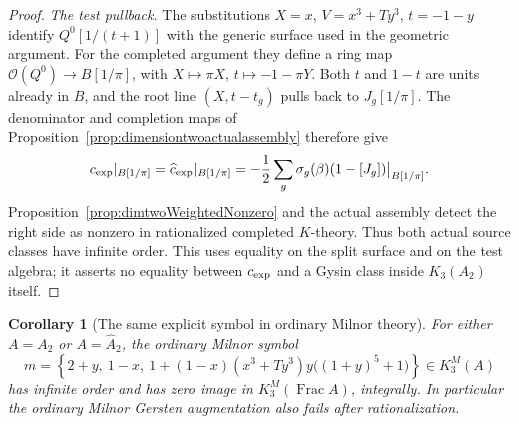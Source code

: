 \documentclass[11pt,a4paper]{article}
\newtheorem{corollary}[theorem]{Corollary}
\theoremstyle{remark}
\newcommand{\Frac}{\operatorname{Frac}}
\begin{document}
\begin{proof}
\emph{The test pullback.}
The substitutions $X=x$, $V=x^3+Ty^3$, $t=-1-y$ identify
$Q^0[1/(t+1)]$ with the generic surface used in the geometric
argument. For the completed argument they define a ring map
$\mathcal O(Q^0)\to B[1/\pi]$,
with $X\mapsto\pi X$, $t\mapsto-1-\pi Y$.
Both $t$ and $1-t$ are units already in $B$, and the root line
$(X,t-t_g)$ pulls back to $J_g[1/\pi]$.
The denominator and completion maps of
Proposition~\ref{prop:dimensiontwoactualassembly} therefore give
\[
 c_{\rm exp}|_{B[1/\pi]}
 =\widehat c_{\rm exp}|_{B[1/\pi]}
 =-\frac12\sum_g\sigma_g(\beta)(1-[J_g])\big|_{B[1/\pi]}.
\]
Proposition~\ref{prop:dimtwoWeightedNonzero} and the actual assembly
detect the right side as nonzero in rationalized completed
$K$-theory. Thus both actual source classes have infinite order.
This uses equality on the split surface and on the test algebra;
it asserts no equality between $c_{\rm exp}$ and a Gysin class
inside $K_3(A_2)$ itself.
\end{proof}



\begin{corollary}[The same explicit symbol in ordinary Milnor theory]
\label{cor:twodimexplicitMilnor}
For either $A=A_2$ or $A=\widehat A_2$, the ordinary Milnor symbol
\[
 m=\left\{2+y,\ 1-x,\
 1+(1-x)(x^3+Ty^3)y\bigl((1+y)^5+1\bigr)\right\}
       \in K_3^M(A)
\]
has infinite order and has zero image in
$K_3^M(\Frac A)$, integrally. In particular the ordinary
Milnor Gersten augmentation also fails after rationalization.
\end{corollary}
\end{document}
